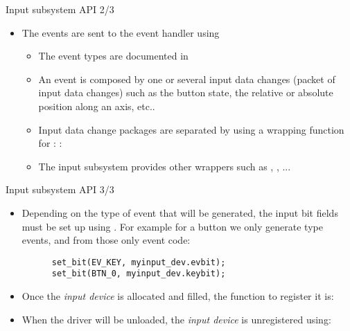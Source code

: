 \begin{frame}[fragile]{Input subsystem API 2/3}
  \begin{itemize}
  \item The events are sent to the event handler using
    \begin{itemize}
    \item The event types are documented in 
    \item An event is composed by one or several input data changes
      (packet of input data changes) such as the button state, the
      relative or absolute position along an axis, etc..
    \item Input data change packages are separated 
      by using a wrapping function for :
      :
    \item The input subsystem provides other wrappers such as
      , , ...
    \end{itemize}
  \end{itemize}
\end{frame}

\begin{frame}[fragile]{Input subsystem API 3/3}
  \begin{itemize}
  \item Depending on the type of event that will be generated, the input
    bit fields must be set up using . For example for
    a button we only generate  type events, and from
    those only  event code:
    \begin{verbatim}
      set_bit(EV_KEY, myinput_dev.evbit);
      set_bit(BTN_0, myinput_dev.keybit);
    \end{verbatim}
  \item Once the {\em input device} is allocated and filled, the
    function to register it
    is: 
  \item When the driver will be unloaded, the {\em input device} is
    unregistered using:
  \end{itemize}
\end{frame}


